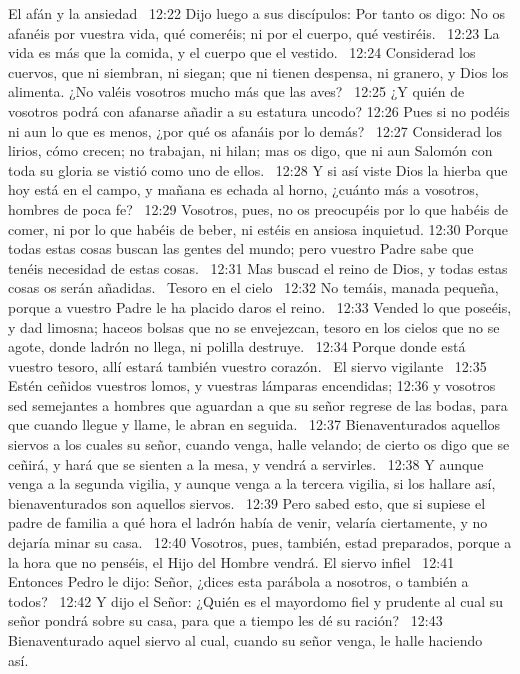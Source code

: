 El afán y la ansiedad   
12:22 Dijo luego a sus discípulos: Por tanto os digo: No os afanéis por vuestra vida, qué comeréis; ni por el cuerpo, qué vestiréis.  
12:23 La vida es más que la comida, y el cuerpo que el vestido.  
12:24 Considerad los cuervos, que ni siembran, ni siegan; que ni tienen despensa, ni granero, y Dios los alimenta. ¿No valéis vosotros mucho más que las aves?  
12:25 ¿Y quién de vosotros podrá con afanarse añadir a su estatura uncodo? 
12:26 Pues si no podéis ni aun lo que es menos, ¿por qué os afanáis por lo demás?  
12:27 Considerad los lirios, cómo crecen; no trabajan, ni hilan; mas os digo, que ni aun Salomón con toda su gloria se vistió como uno de ellos.  
12:28 Y si así viste Dios la hierba que hoy está en el campo, y mañana es echada al horno, ¿cuánto más a vosotros, hombres de poca fe?  
12:29 Vosotros, pues, no os preocupéis por lo que habéis de comer, ni por lo que habéis de beber, ni estéis en ansiosa inquietud. 
12:30 Porque todas estas cosas buscan las gentes del mundo; pero vuestro Padre sabe que tenéis necesidad de estas cosas.  
12:31 Mas buscad el reino de Dios, y todas estas cosas os serán añadidas.  
Tesoro en el cielo   
12:32 No temáis, manada pequeña, porque a vuestro Padre le ha placido daros el reino.  
12:33 Vended lo que poseéis, y dad limosna; haceos bolsas que no se envejezcan, tesoro en los cielos que no se agote, donde ladrón no llega, ni polilla destruye.  
12:34 Porque donde está vuestro tesoro, allí estará también vuestro corazón.  
El siervo vigilante  
12:35 Estén ceñidos vuestros lomos, y vuestras lámparas encendidas; 
12:36 y vosotros sed semejantes a hombres que aguardan a que su señor regrese de las bodas, para que cuando llegue y llame, le abran en seguida.  
12:37 Bienaventurados aquellos siervos a los cuales su señor, cuando venga, halle velando; de cierto os digo que se ceñirá, y hará que se sienten a la mesa, y vendrá a servirles.  
12:38 Y aunque venga a la segunda vigilia, y aunque venga a la tercera vigilia, si los hallare así, bienaventurados son aquellos siervos.  
12:39 Pero sabed esto, que si supiese el padre de familia a qué hora el ladrón había de venir, velaría ciertamente, y no dejaría minar su casa.  
12:40 Vosotros, pues, también, estad preparados, porque a la hora que no penséis, el Hijo del Hombre vendrá. 
El siervo infiel   
12:41 Entonces Pedro le dijo: Señor, ¿dices esta parábola a nosotros, o también a todos?  
12:42 Y dijo el Señor: ¿Quién es el mayordomo fiel y prudente al cual su señor pondrá sobre su casa, para que a tiempo les dé su ración?  
12:43 Bienaventurado aquel siervo al cual, cuando su señor venga, le halle haciendo así.  
